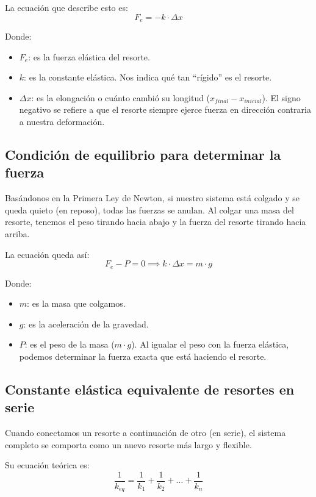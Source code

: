 \documentclass[12pt,a4paper]{article}
\begin{document}
La ecuación que describe esto es:
\begin{equation}
F_e = -k \cdot \Delta x
\end{equation}

Donde:
\begin{itemize}
    \item $F_e$: es la fuerza elástica del resorte.
    \item $k$: es la constante elástica. Nos indica qué tan ``rígido'' es el resorte.
    \item $\Delta x$: es la elongación o cuánto cambió su longitud ($x_{final} - x_{inicial}$). El signo negativo se refiere a que el resorte siempre ejerce fuerza en dirección contraria a nuestra deformación.
\end{itemize}

\subsection{Condición de equilibrio para determinar la fuerza}
Basándonos en la Primera Ley de Newton, si nuestro sistema está colgado y se queda quieto (en reposo), todas las fuerzas se anulan. Al colgar una masa del resorte, tenemos el peso tirando hacia abajo y la fuerza del resorte tirando hacia arriba.

La ecuación queda así:
\begin{equation}
    F_e - P = 0 \implies k \cdot \Delta x = m \cdot g
\end{equation}

Donde:
\begin{itemize}
    \item $m$: es la masa que colgamos.
    \item $g$: es la aceleración de la gravedad.
    \item $P$: es el peso de la masa ($m \cdot g$). Al igualar el peso con la fuerza elástica, podemos determinar la fuerza exacta que está haciendo el resorte.
\end{itemize}

\subsection{Constante elástica equivalente de resortes en serie}
Cuando conectamos un resorte a continuación de otro (en serie), el sistema completo se comporta como un nuevo resorte más largo y flexible.

Su ecuación teórica es:
\begin{equation}
    \frac{1}{k_{eq}} = \frac{1}{k_1} + \frac{1}{k_2} + \dots + \frac{1}{k_n}
\end{equation}
\end{document}
